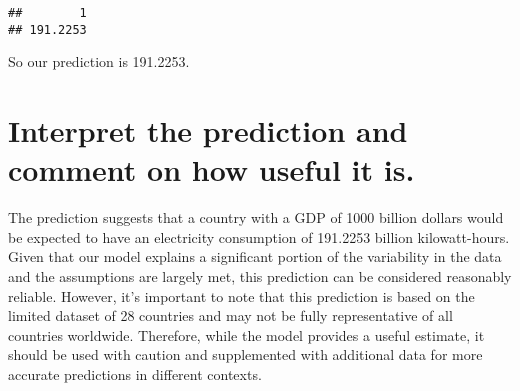 \documentclass[
]{article}
\newenvironment{Shaded}{\begin{snugshade}}{\end{snugshade}}
\newcommand{\AttributeTok}[1]{\textcolor[rgb]{0.13,0.29,0.53}{#1}}
\newcommand{\CommentTok}[1]{\textcolor[rgb]{0.56,0.35,0.01}{\textit{#1}}}
\newcommand{\ConstantTok}[1]{\textcolor[rgb]{0.56,0.35,0.01}{#1}}
\newcommand{\DecValTok}[1]{\textcolor[rgb]{0.00,0.00,0.81}{#1}}
\newcommand{\FunctionTok}[1]{\textcolor[rgb]{0.13,0.29,0.53}{\textbf{#1}}}
\newcommand{\NormalTok}[1]{#1}
\newcommand{\OtherTok}[1]{\textcolor[rgb]{0.56,0.35,0.01}{#1}}
\newcommand{\SpecialCharTok}[1]{\textcolor[rgb]{0.81,0.36,0.00}{\textbf{#1}}}
\newcommand{\StringTok}[1]{\textcolor[rgb]{0.31,0.60,0.02}{#1}}
\begin{document}
\begin{Shaded}
\end{Shaded}

\begin{verbatim}
##        1 
## 191.2253
\end{verbatim}

So our prediction is 191.2253.

\section{Interpret the prediction and comment on how useful it
is.}\label{interpret-the-prediction-and-comment-on-how-useful-it-is.}

The prediction suggests that a country with a GDP of 1000 billion
dollars would be expected to have an electricity consumption of 191.2253
billion kilowatt-hours. Given that our model explains a significant
portion of the variability in the data and the assumptions are largely
met, this prediction can be considered reasonably reliable. However,
it's important to note that this prediction is based on the limited
dataset of 28 countries and may not be fully representative of all
countries worldwide. Therefore, while the model provides a useful
estimate, it should be used with caution and supplemented with
additional data for more accurate predictions in different contexts.
\end{document}
